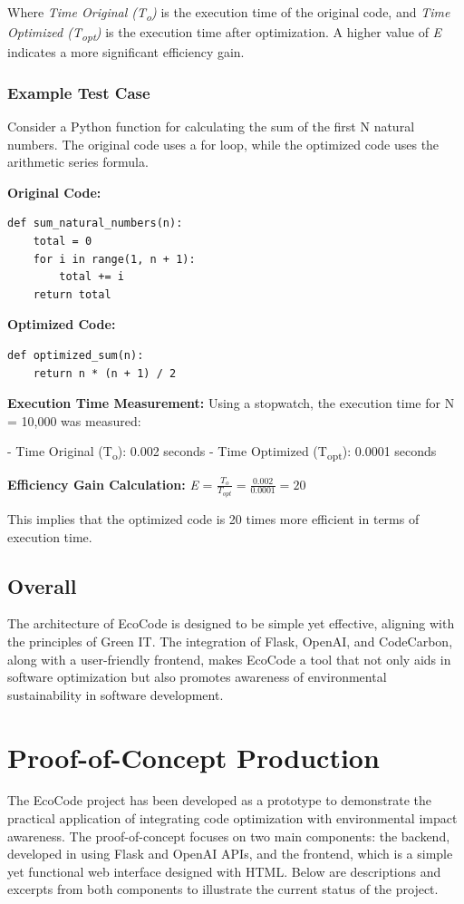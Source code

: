 \documentclass[conference,compsoc]{IEEEtran}
\begin{document}
Where \textit{Time Original (T\textsubscript{o})} is the execution time of the original code, and \textit{Time Optimized (T\textsubscript{opt})} is the execution time after optimization. A higher value of \textit{E} indicates a more significant efficiency gain.

\subsubsection{Example Test Case}
Consider a Python function for calculating the sum of the first N natural numbers. The original code uses a for loop, while the optimized code uses the arithmetic series formula.

\textbf{Original Code:}
\begin{verbatim}
def sum_natural_numbers(n):
    total = 0
    for i in range(1, n + 1):
        total += i
    return total
\end{verbatim}

\textbf{Optimized Code:}
\begin{verbatim}
def optimized_sum(n):
    return n * (n + 1) / 2
\end{verbatim}

\textbf{Execution Time Measurement:}
Using a stopwatch, the execution time for N = 10,000 was measured:

- Time Original (T\textsubscript{o}): 0.002 seconds
- Time Optimized (T\textsubscript{opt}): 0.0001 seconds

\textbf{Efficiency Gain Calculation:}
\textit{E} = $\frac{T_{o}}{T_{opt}} = \frac{0.002}{0.0001} = 20$

This implies that the optimized code is 20 times more efficient in terms of execution time.

\subsection{Overall}
The architecture of EcoCode is designed to be simple yet effective, aligning with the principles of Green IT. The integration of Flask, OpenAI, and CodeCarbon, along with a user-friendly frontend, makes EcoCode a tool that not only aids in software optimization but also promotes awareness of environmental sustainability in software development.

\section{Proof-of-Concept Production}
The EcoCode project has been developed as a prototype to demonstrate the practical application of integrating code optimization with environmental impact awareness. The proof-of-concept focuses on two main components: the backend, developed in  using Flask and OpenAI APIs, and the frontend, which is a simple yet functional web interface designed with HTML. Below are descriptions and excerpts from both components to illustrate the current status of the project.
\end{document}
